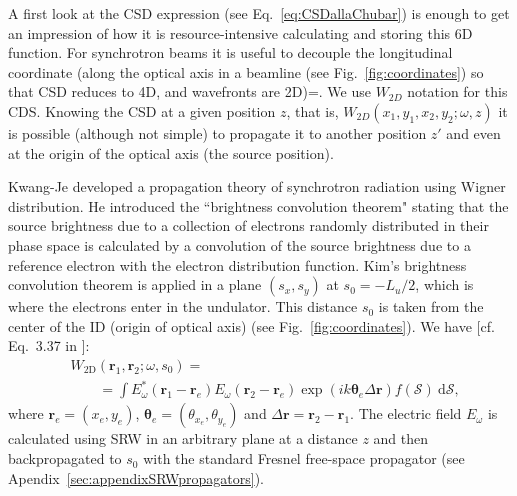 \documentclass{iucr}              %
\begin{document}
A first look at the CSD expression (see Eq.~\ref{eq:CSDallaChubar}) is enough to get an impression of how it is resource-intensive calculating and storing this 6D function. For synchrotron beams it is useful to decouple the longitudinal coordinate (along the optical axis in a beamline (see Fig.~\ref{fig:coordinates}) so that CSD reduces to 4D, and wavefronts are 2D)=. We use $W_{2D}$ notation for this CDS.  Knowing the CSD at a given position $z$, that is, $W_{2D}(x_1,y_1,x_2,y_2; \omega, z)$ it is possible (although not simple) to propagate it to another position $z'$ and even at the origin of the optical axis (the source position).

Kwang-Je  developed a propagation theory of synchrotron radiation using Wigner distribution. He introduced the ``brightness convolution theorem" stating that the source brightness due to a collection of electrons randomly distributed in their phase space is calculated by a convolution of the source brightness due to a reference electron with the electron distribution function. 
Kim's brightness convolution theorem is applied in a plane $(s_x,s_y)$ at $s_0=-L_u\big/2$, which is where the  electrons enter in the undulator. This distance $s_0$ is taken from the center of the ID (origin of optical axis) (see Fig.~\ref{fig:coordinates}). We have [cf. Eq.~3.37 in \cite{glassThesis}]:
\begin{equation}\label{eq:comsyl_W2D}
\begin{split}
& W_\text{2D}(\textbf{r}_1,\textbf{r}_2;\omega,s_0) = \\
&\qquad=\int E_\omega^*(\textbf{r}_1-\textbf{r}_e)
    E_\omega(\textbf{r}_2-\textbf{r}_e) \exp(i k \mathbf{\theta}_e\Delta\textbf{r})f(\mathcal{S})~\text{d}\mathcal{S},
\end{split}
\end{equation}
where $\textbf{r}_e=(x_e,y_e)$, $\mathbf{\theta}_e=(\theta_{x_e},\theta_{y_e})$ and $\Delta\textbf{r}=\textbf{r}_2-\textbf{r}_1$. The electric field $E_\omega$ is calculated using SRW in an arbitrary plane at a distance $z$ and then backpropagated to $s_0$ with the standard Fresnel free-space propagator (see Apendix~\ref{sec:appendixSRWpropagators}).
\end{document}
